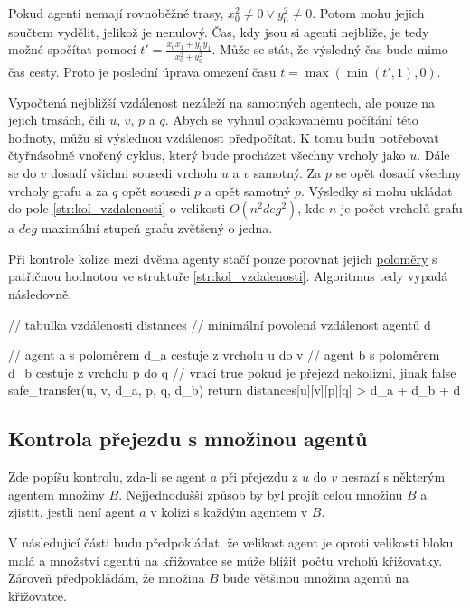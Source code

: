 Pokud agenti nemají rovnoběžné trasy, $x^2_0 \neq 0 \vee y^2_0 \neq 0$.
Potom mohu jejich součtem vydělit, jelikož je nenulový.
Čas, kdy jsou si agenti nejblíže, je tedy možné spočítat pomocí $t' = \frac{x_0 x_1 + y_0 y_1}{x^2_0 + y^2_0}$.
Může se stát, že výsledný čas bude mimo čas cesty.
Proto je poslední úprava omezení času $t = \max(\min(t', 1), 0)$.

Vypočtená nejbližší vzdálenost nezáleží na samotných agentech, ale pouze na jejich trasách, čili $u$, $v$, $p$ a $q$.
Abych se vyhnul opakovanému počítání této hodnoty, můžu si výslednou vzdálenost předpočítat.
K tomu budu potřebovat čtyřnásobně vnořený cyklus, který bude procházet všechny vrcholy jako $u$.
Dále se do $v$ dosadí všichni sousedi vrcholu $u$ a $v$ samotný.
Za $p$ se opět dosadí všechny vrcholy grafu a za $q$ opět sousedi $p$ a opět samotný $p$.
Výsledky si mohu ukládat do pole \ref{str:kol_vzdalenosti}
o velikosti $O(n^2 deg^2)$, kde $n$ je počet vrcholů grafu a $deg$ maximální stupeň grafu zvětšený o jedna.

Při kontrole kolize mezi dvěma agenty stačí pouze porovnat jejich \hyperref[par:polomer_agent]{poloměry}
s patřičnou hodnotou ve struktuře \ref{str:kol_vzdalenosti}.
Algoritmus tedy vypadá následovně.
\begin{code}[fontsize=\footnotesize]
// tabulka vzdálenosti distances
// minimální povolená vzdálenost agentů d

// agent a s poloměrem d_a cestuje z vrcholu u do v
// agent b s poloměrem d_b cestuje z vrcholu p do q
// vrací true pokud je přejezd nekolizní, jinak false
safe_transfer(u, v, d_a, p, q, d_b)
	return distances[u][v][p][q] > d_a + d_b + d
\end{code}

\subsection{Kontrola přejezdu s množinou agentů}\label{subsec:kontrola_prejezdu_mnozina_agentu}

Zde popíšu kontrolu, zda-li se agent $a$ při přejezdu z $u$ do $v$ nesrazí s některým agentem množiny $B$.
Nejjednodušší způsob by byl projít celou množinu $B$ a zjistit, jestli není agent $a$ v kolizi s každým agentem v $B$.

V následující části budu předpokládat, že velikost agent je oproti velikosti bloku malá a
množství agentů na křižovatce se může blížit počtu vrcholů křižovatky.
Zároveň předpokládám, že množina $B$ bude většinou množina agentů na křižovatce.

